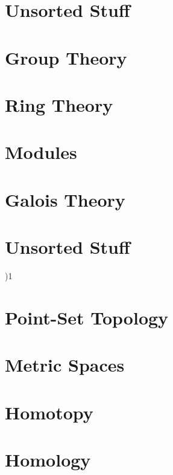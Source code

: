 \documentclass{book}                                                           %
\newcommand*{\TOPPATH}{books}
\newcommand*{\PATH}{\TOPPATH/}
\newcounter{endpage}
\def\compiletopology{)}
\begin{document}
        \part{Unsorted Stuff}
            
            
            
            
            
    \else
        \part{Group Theory}
        \part{Ring Theory}
        \part{Modules}
        \part{Galois Theory}
        \part{Unsorted Stuff}
    \fi
    \clearpage

    \setcounter{endpage}{\thepage}
    \label{book:Topology}%
    \renewcommand{\PATH}{\TOPPATH/Topology}
    \setcounter{page}{\value{endpage}}

    \if\compiletopology1
        \part{Point-Set Topology}
            
            
        \part{Metric Spaces}
        \part{Homotopy}
            
        \part{Homology}
\end{document}
